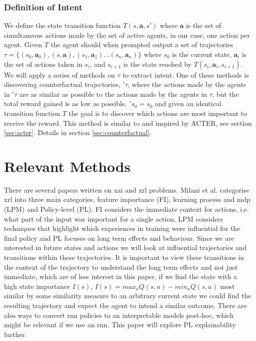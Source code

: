 \documentclass[UKenglish]{uiomasterthesis}
\begin{document}
\subsubsection{Definition of Intent}
We define the state transition function $T(s, \textbf{a}, s')$ where $\textbf{a}$ is the set of simultaneous actions made by the set of active agents, in our case, one action per agent. Given $T$ the agent should when prompted output a set of trajectories $\tau = \{(s_0,\textbf{a}_0),(s,\textbf{a}),(s_1,\textbf{a}_1)...(s_n,\textbf{a}_n)\}$ where $s_0$ is the current state, $\textbf{a}_i$ is the set of actions taken in $s_i$, and $s_{i+1}$ is the state reached by $T(s_i,\textbf{a}_i, s_{i+1})$. We will apply a series of methods on $\tau$ to extract intent. One of these methods is discovering counterfactual trajectories, $'\tau$, where the actions made by the agents in $'\tau$ are as similar as possible to the actions made by the agents in $\tau$, but the total reward gained is as low as possible. $'s_0 = s_0$ and given an identical transition function $T$ the goal is to discover which actions are most important to receive the reward. This method is similar to and inspired by ACTER\cite{gajcin2024acter}, see section \ref{sec:acter}. Details in section \ref{sec:counterfactual}.


\section{Relevant Methods}
There are several papers written on \ac{xai} and \ac{xrl} problems. Milani et al.\cite{milani2022survey} categorise \ac{xrl} into three main categories, feature importance (FI), learning process and \ac{mdp} (LPM) and Policy-level (PL). FI considers the immediate context for actions, i.e. what part of the input was important for a single action, LPM considers techniques that highlight which experiences in training were influential for the final policy and PL focuses on long term effects and behaviour. Since we are interested in future states and actions we will look at influential trajectories and transitions within these trajectories. It is important to view these transitions in the context of the trajectory to understand the long term effects and not just immediate, which are of less interest in this paper, if we find the state with a high state importance $I(s)$, $I(s) = max_aQ(s,a)-min_aQ(s,a)$ most similar by some similarity measure to an arbitrary current state we could find the resulting trajectory and expect the agent to intend a similar outcome. There are also ways to convert \ac{rnn} policies to an interpretable models post-hoc, which might be relevant if we use an \ac{rnn}. This paper will explore PL explainability further.
\end{document}
